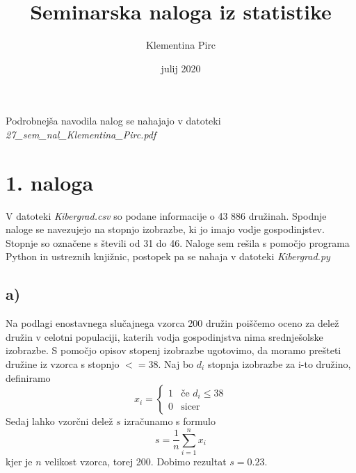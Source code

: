 \documentclass[A4paper, 11pt]{article}
\title{Seminarska naloga iz statistike}
\author{Klementina Pirc}
\affil{Fakulteta za matematiko in fiziko \\ Oddelek za matematiko}
\date{julij 2020}
\begin{document}
\begin{titlepage} 

\maketitle
\thispagestyle{empty}
	
\end{titlepage}

Podrobnejša navodila nalog se nahajajo v datoteki \textit{27\_sem\_nal\_Klementina\_Pirc.pdf}


\section*{1. naloga}

V datoteki \textit{Kibergrad.csv} so podane informacije o 43 886 družinah. Spodnje naloge se navezujejo na stopnjo izobrazbe, ki jo imajo vodje gospodinjstev. Stopnje so označene s števili od 31 do 46. Naloge sem rešila s pomočjo programa Python in ustreznih knjižnic, postopek pa se nahaja v datoteki \textit{Kibergrad.py}

\subsection*{a)}
Na podlagi enostavnega slučajnega vzorca 200 družin poiščemo oceno za delež družin v celotni populaciji, katerih vodja gospodinjstva nima srednješolske izobrazbe. S pomočjo opisov stopenj izobrazbe ugotovimo, da moramo prešteti družine iz vzorca s stopnjo $<= 38$. Naj bo $d_i$ stopnja izobrazbe za i-to družino, definiramo 
\[x_i = \left \{
	\begin{array}{ll}
		1  & \mbox{če } d_i \leq 38 \\
		0 & \mbox{sicer}
	\end{array}
	\right.
\]
Sedaj lahko vzorčni delež $s$ izračunamo s formulo
\[ s = \frac{1}{n} \sum_{i=1}^{n} x_i \]
kjer je $n$ velikost vzorca, torej 200. Dobimo rezultat $s = 0.23$.  
\end{document}
